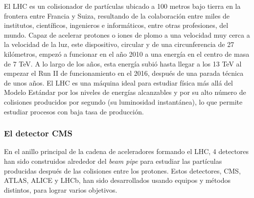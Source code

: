 \documentclass[a4paper, 10pt, openright]{report}
\begin{document}
\begin{appendices}
El \ac{LHC} es un colisionador de part\'{i}culas ubicado a 100 metros bajo tierra en la frontera entre Francia y Suiza, resultando de la colaboraci\'{o}n entre miles de institutos, cient\'{i}ficos, ingenieros e inform\'{a}ticos, entre otras profesiones, del mundo. Capaz de acelerar protones o iones de plomo a una velocidad muy cerca a la velocidad de la luz, este dispositivo, circular y de una circunferencia de 27 kil\'{o}metros, empez\'{o} a funcionar en el a\~{n}o 2010 a una energ\'{i}a en el centro de masa de 7 TeV. A lo largo de los a\~{n}os, esta energ\'{i}a subi\'{o} hasta llegar a los 13 TeV al empezar el Run II de funcionamiento en el 2016, despu\'{e}s de una parada t\'{e}cnica de unos a\~{n}os. El \ac{LHC} es una m\'{a}quina ideal para estudiar f\'{i}sica m\'{a}s all\'{a} del Modelo Est\'{a}ndar por los niveles de energ\'{i}as alcanzables y por su alto n\'{u}mero de colisiones producidos por segundo (su luminosidad instant\'{a}nea), lo que permite estudiar procesos con baja tasa de producci\'{o}n.

\subsubsection{El detector CMS}

En el anillo principal de la cadena de aceleradores formando el \ac{LHC}, 4 detectores han sido construidos alrededor del \textit{beam pipe} para estudiar las part\'{i}culas producidas despu\'{e}s de las colisiones entre los protones. Estos detectores, \ac{CMS}, \ac{ATLAS}, \ac{ALICE} y LHCb, han sido desarrollados usando equipos y m\'{e}todos distintos, para lograr varios objetivos. 


\end{appendices}
\end{document}
